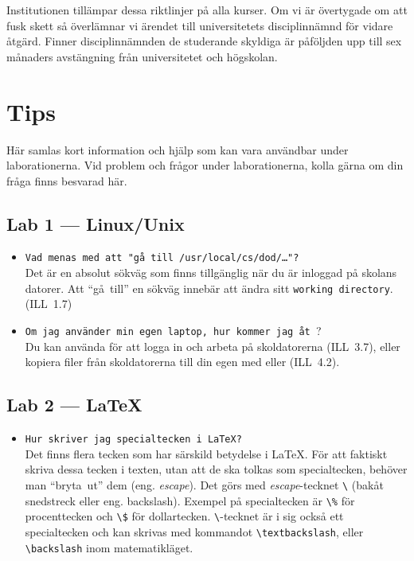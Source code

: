\documentclass[fleqn, article, a4paper]{memoir}
\begin{document}
\blankline
\n Institutionen tillämpar dessa riktlinjer på alla kurser. Om vi är övertygade om att fusk skett så överlämnar vi ärendet till universitetets disciplinnämnd för vidare åtgärd. Finner disciplinnämnden de studerande skyldiga är påföljden upp till sex månaders avstängning från universitetet och högskolan.

\newpage
\section{Tips}

Här samlas kort information och hjälp som kan vara användbar under laborationerna. Vid problem och frågor under laborationerna, kolla gärna om din fråga finns besvarad här.

\subsection{Lab 1 --- Linux/Unix}
\begin{itemize}
	\item \texttt{Vad menas med att "gå till /usr/local/cs/dod/\dots"?}\\
	      Det är en absolut sökväg som finns tillgänglig när du är inloggad på skolans datorer. Att ``gå~till'' en sökväg innebär att ändra sitt \texttt{working directory}. (ILL~1.7)
	\item \texttt{Om jag använder min egen laptop, hur kommer jag åt }?\\
	      Du kan använda  för att logga in och arbeta på skoldatorerna (ILL~3.7), eller kopiera filer från skoldatorerna till din egen med  eller  (ILL~4.2).
\end{itemize}

\subsection{Lab 2 --- \LaTeX}

\begin{itemize}
	\item \texttt{Hur skriver jag specialtecken i \LaTeX{}?}\\
	      Det finns flera tecken som har särskild betydelse i \LaTeX{}. För att faktiskt skriva dessa tecken i texten, utan att de ska tolkas som specialtecken, behöver man ``bryta~ut'' dem (eng. \emph{escape}). Det görs med \emph{escape}-tecknet \texttt{\textbackslash} (bakåt snedstreck eller eng. backslash). Exempel på specialtecken är \texttt{\textbackslash\%} för procenttecken och \texttt{\textbackslash\$} för dollartecken. \texttt{\textbackslash}-tecknet är i sig också ett specialtecken och kan skrivas med kommandot \texttt{\textbackslash{textbackslash}}, eller \texttt{\textbackslash{backslash}} inom matematikläget.

\end{itemize}
\end{document}
